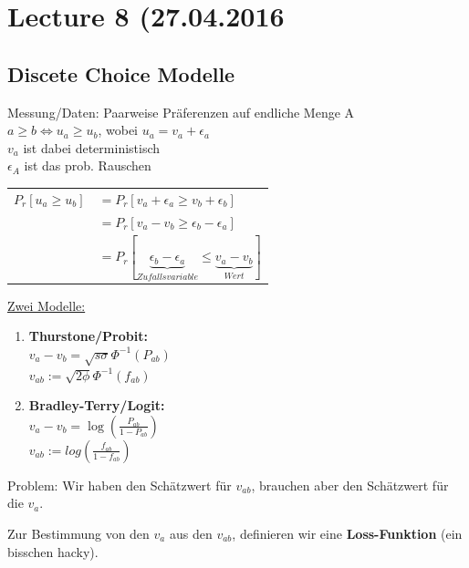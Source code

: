 
\section*{Lecture 8 (27.04.2016}
\subsection{Discete Choice Modelle}

Messung/Daten: Paarweise Präferenzen auf endliche Menge A\\

$a \geq b \Leftrightarrow u_a \geq u_b$, wobei $u_a = v_a+ \epsilon_a$\\
$v_a$ ist dabei deterministisch\\
$\epsilon_A$ ist das prob. Rauschen\\

\begin{center}


\begin{tabular}{r l}
$P_r[u_a \geq u_b]$&$ = P_r[v_a + \epsilon_a \geq v_b + \epsilon_b]$\\
&$ = P_r[v_a -v_b \geq \epsilon_b - \epsilon_a]$\\
&$ = P_r[\underbrace{\epsilon_b - \epsilon_a}_{Zufallsvariable} \leq \underbrace{v_a -v_b}_{Wert} ]$
\end{tabular}
\end{center}


\underline{Zwei Modelle:} 
\begin{enumerate}
\item \textbf{Thurstone/Probit:}\\ $v_a - v_b = \sqrt{s \sigma} \Phi^{-1}(P_{ab})$\\$v_{ab} := \sqrt{2\phi} \Phi^{-1}(f_{ab})$

\item \textbf{Bradley-Terry/Logit:} \\$v_a - v_b = \log(\frac{P_{ab}}{1-P_{ab}})$\\$v_{ab} := log(\frac{f_{ab}}{1-f_{ab}})$

\end{enumerate}

Problem: Wir haben den Schätzwert für $v_{ab}$, brauchen aber den Schätzwert für die $v_a$.\newline\newline

Zur Bestimmung von den $v_a$ aus den $v_{ab}$, definieren wir eine \textbf{Loss-Funktion} (ein bisschen hacky).

